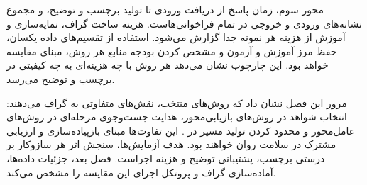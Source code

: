 محور سوم، زمان پاسخ از دریافت ورودی تا تولید برچسب و توضیح، و مجموع نشانه‌های ورودی و خروجی در تمام فراخوانی‌هاست. هزینه ساخت گراف، نمایه‌سازی و آموزش از هزینه هر نمونه جدا گزارش می‌شود. استفاده از تقسیم‌های داده یکسان، حفظ مرز آموزش و آزمون و مشخص کردن بودجه منابع هر روش، مبنای مقایسه خواهد بود. این چارچوب نشان می‌دهد هر روش با چه هزینه‌ای به چه کیفیتی در برچسب و توضیح می‌رسد.

مرور این فصل نشان داد که روش‌های منتخب، نقش‌های متفاوتی به گراف می‌دهند: انتخاب شواهد در روش‌های بازیابی‌محور، هدایت جست‌وجوی مرحله‌ای در روش‌های عامل‌محور و محدود کردن تولید مسیر در . این تفاوت‌ها مبنای بازپیاده‌سازی و ارزیابی مشترک در سلامت روان خواهند بود. هدف آزمایش‌ها، سنجش اثر هر سازوکار بر درستی برچسب، پشتیبانی توضیح و هزینه اجراست. فصل بعد، جزئیات داده‌ها، آماده‌سازی گراف و پروتکل اجرای این مقایسه را مشخص می‌کند.
